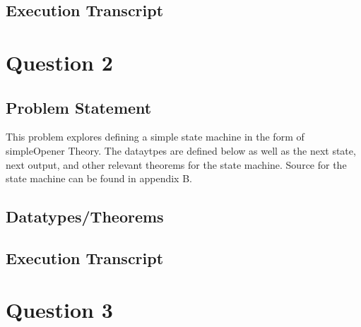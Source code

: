 \documentclass[11pt, twoside]{article}
\begin{document}
\subsection{Execution Transcript}
\label{sec:execution-transcript}



\newpage

\section{Question 2}
\label{sec:question-2}

\subsection{Problem Statement}
\label{sec:problem-statement-1}

This problem explores defining a simple state machine in the form of simpleOpener Theory. The dataytpes 
are defined below as well as the next state, next output, and other relevant theorems for the state machine.
Source for the state machine can be found in appendix B.

\subsection{Datatypes/Theorems}
\label{sec:datatypestheorems}

\HOLsimpleOpenerDatatypes
\HOLsimpleOpenerTheoremssimpleOpenernsXXdef
\HOLsimpleOpenerTheoremssimpleOpeneroutXXdef

\HOLsimpleOpenerTheoremscommandXXdistinctXXclauses
\HOLsimpleOpenerTheoremsoutputXXdistinctXXclauses
\HOLsimpleOpenerTheoremssimpleCounterXXrules
\HOLsimpleOpenerTheoremssimpleOpenernsXXind
\HOLsimpleOpenerTheoremssimpleOpeneroutXXind
\HOLsimpleOpenerTheoremssimpleOpenerTRXXclauses
\HOLsimpleOpenerTheoremssimpleOpenerTRXXrules
\HOLsimpleOpenerTheoremssimpleOpenerTransXXEquivXXTR
\HOLsimpleOpenerTheoremsstateXXdistinctXXclauses

\subsection{Execution Transcript}
\label{sec:execution-transcript-1}





\newpage

\section{Question 3}
\label{sec:question-3}
\end{document}
